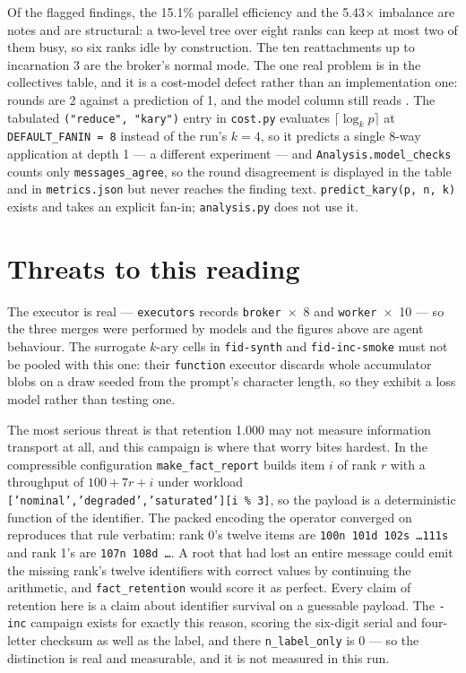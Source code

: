 \documentclass[11pt]{article}
\begin{document}
Of the flagged findings, the 15.1\% parallel efficiency and the 5.43$\times$ imbalance are
notes and are structural: a two-level tree over eight ranks can keep at most two of them
busy, so six ranks idle by construction. The ten reattachments up to incarnation 3 are the
broker's normal mode. The one real problem is in the collectives table, and it is a cost-model
defect rather than an implementation one: rounds are 2 against a prediction of 1, and the
model column still reads \modelok. The tabulated \texttt{("reduce", "kary")} entry in
\texttt{cost.py} evaluates $\lceil\log_k p\rceil$ at \texttt{DEFAULT\_FANIN = 8} instead of
the run's $k=4$, so it predicts a single 8-way application at depth 1 --- a different
experiment --- and \texttt{Analysis.model\_checks} counts only \texttt{messages\_agree}, so
the round disagreement is displayed in the table and in \texttt{metrics.json} but never
reaches the finding text. \texttt{predict\_kary(p, n, k)} exists and takes an explicit
fan-in; \texttt{analysis.py} does not use it.

\section{Threats to this reading}

The executor is real --- \texttt{executors} records \texttt{broker}~$\times$~8 and
\texttt{worker}~$\times$~10 --- so the three merges were performed by models and the figures
above are agent behaviour. The surrogate $k$-ary cells in \texttt{fid-synth} and
\texttt{fid-inc-smoke} must not be pooled with this one: their \texttt{function} executor
discards whole accumulator blobs on a draw seeded from the prompt's character length, so
they exhibit a loss model rather than testing one.

The most serious threat is that retention 1.000 may not measure information transport at
all, and this campaign is where that worry bites hardest. In the compressible
configuration \texttt{make\_fact\_report} builds item $i$ of rank $r$ with a throughput of
$100 + 7r + i$ under workload \texttt{['nominal','degraded','saturated'][i \% 3]}, so the
payload is a deterministic function of the identifier. The packed encoding the operator
converged on reproduces that rule verbatim: rank 0's twelve items are \texttt{100n 101d
102s \dots 111s} and rank 1's are \texttt{107n 108d \dots}. A root that had lost an entire
message could emit the missing rank's twelve identifiers with correct values by continuing
the arithmetic, and \texttt{fact\_retention} would score it as perfect. Every claim of
retention here is a claim about identifier survival on a guessable payload. The
\texttt{-inc} campaign exists for exactly this reason, scoring the six-digit serial and
four-letter checksum as well as the label, and there \texttt{n\_label\_only} is 0 --- so the
distinction is real and measurable, and it is not measured in this run.
\end{document}
